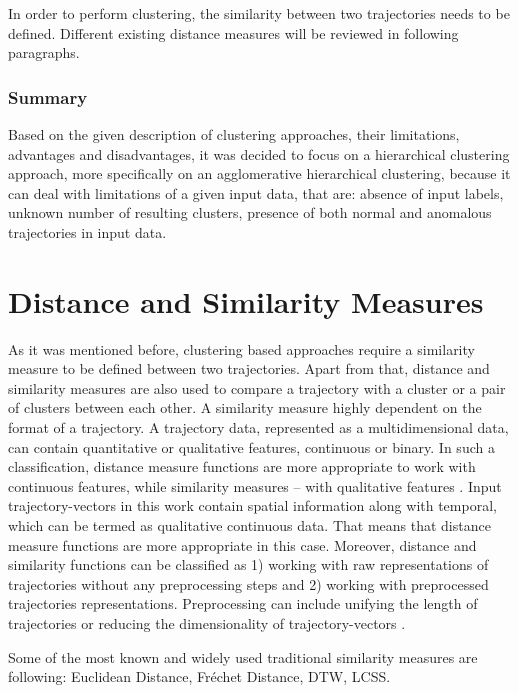 In order to perform clustering, the similarity between two trajectories needs to be defined. Different existing distance measures will be reviewed in following paragraphs.

\subsubsection{Summary}

Based on the given description of clustering approaches, their limitations, advantages and disadvantages, it was decided to focus on a hierarchical clustering approach, more specifically on an agglomerative hierarchical clustering, because it can deal with limitations of a given input data, that are: absence of input labels, unknown number of resulting clusters, presence of both normal and anomalous trajectories in input data.

\section{Distance and Similarity Measures}
As it was mentioned before, clustering based approaches require a similarity measure to be defined between two trajectories. Apart from that, distance and similarity measures are also used to compare a trajectory with a cluster or a pair of clusters between each other. A similarity measure highly dependent on the format of a trajectory. A trajectory data, represented as a multidimensional data, can contain quantitative or qualitative features, continuous or binary. In such a classification, distance measure functions are more appropriate to work with continuous features, while similarity measures – with qualitative features \cite{article:23_survey_ca}. Input trajectory-vectors in this work contain spatial information along with temporal, which can be termed as qualitative continuous data. That means that distance measure functions are more appropriate in this case. Moreover, distance and similarity functions can be classified as 1) working with raw representations of trajectories without any preprocessing steps and 2) working with preprocessed trajectories representations. Preprocessing can include unifying the length of trajectories or reducing the dimensionality of trajectory-vectors \cite{inproceedings:7_related_work}. 

Some of the most known and widely used traditional similarity measures are following: Euclidean Distance, Fréchet Distance, DTW, LCSS.

